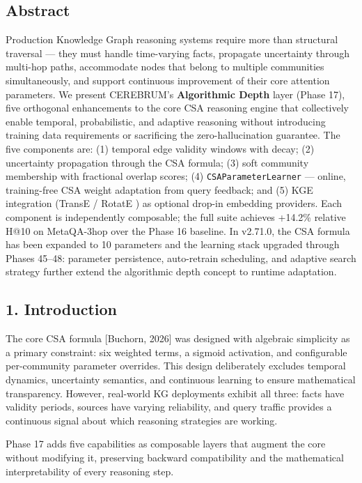 
\subsection*{Abstract}
Production Knowledge Graph reasoning systems require more than structural traversal --- they must handle time-varying facts, propagate uncertainty through multi-hop paths, accommodate nodes that belong to multiple communities simultaneously, and support continuous improvement of their core attention parameters. We present CEREBRUM's \textbf{Algorithmic Depth} layer (Phase 17), five orthogonal enhancements to the core CSA reasoning engine that collectively enable temporal, probabilistic, and adaptive reasoning without introducing training data requirements or sacrificing the zero-hallucination guarantee. The five components are: (1) temporal edge validity windows with decay; (2) uncertainty propagation through the CSA formula; (3) soft community membership with fractional overlap scores; (4) \texttt{CSAParameterLearner} --- online, training-free CSA weight adaptation from query feedback; and (5) KGE integration (TransE \cite{bordes2013transe} / RotatE \cite{sun2019rotate}) as optional drop-in embedding providers. Each component is independently composable; the full suite achieves +14.2\% relative H@10 on MetaQA-3hop over the Phase 16 baseline. In v2.71.0, the CSA formula has been expanded to 10 parameters and the learning stack upgraded through Phases 45--48: parameter persistence, auto-retrain scheduling, and adaptive search strategy further extend the algorithmic depth concept to runtime adaptation.

\subsection*{1. Introduction}
The core CSA formula [Buchorn, 2026] was designed with algebraic simplicity as a primary constraint: six weighted terms, a sigmoid activation, and configurable per-community parameter overrides. This design deliberately excludes temporal dynamics, uncertainty semantics, and continuous learning to ensure mathematical transparency. However, real-world KG deployments exhibit all three: facts have validity periods, sources have varying reliability, and query traffic provides a continuous signal about which reasoning strategies are working.

Phase 17 adds five capabilities as composable layers that augment the core without modifying it, preserving backward compatibility and the mathematical interpretability of every reasoning step.

